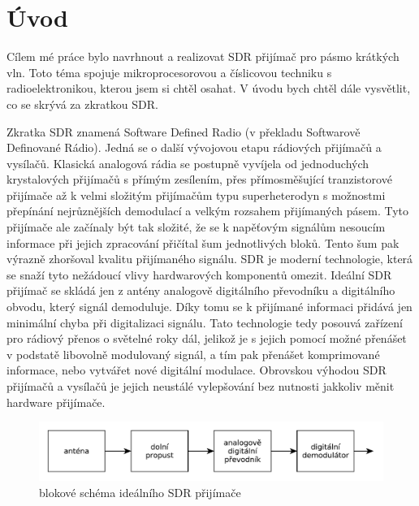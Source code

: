 \section*{Úvod}
\indent\indent Cílem mé práce bylo navrhnout a realizovat SDR přijímač pro pásmo krátkých vln. Toto téma spojuje mikroprocesorovou a číslicovou techniku s radioelektronikou, kterou jsem si chtěl osahat. V úvodu bych chtěl dále vysvětlit, co se skrývá za zkratkou SDR.

Zkratka SDR znamená Software Defined Radio (v překladu Softwarově Definované Rádio). Jedná se o další vývojovou etapu rádiových přijímačů a vysílačů. Klasická analogová rádia se postupně vyvíjela od jednoduchých krystalových přijímačů s přímým zesílením, přes přímosměšující tranzistorové přijímače až k velmi složitým přijímačům typu superheterodyn s možnostmi přepínání nejrůznějších demodulací a velkým rozsahem přijímaných pásem. Tyto přijímače ale začínaly být tak složité, že se k napěťovým signálům nesoucím informace při jejich zpracování přičítal šum jednotlivých bloků. Tento šum pak výrazně zhoršoval kvalitu přijímaného signálu. SDR je moderní technologie, která se snaží tyto nežádoucí vlivy hardwarových komponentů omezit. Ideální SDR přijímač se skládá jen z antény analogově digitálního převodníku a digitálního obvodu, který signál demoduluje. Díky tomu se k přijímané informaci přidává jen minimální chyba při digitalizaci signálu. Tato technologie tedy posouvá zařízení pro rádiový přenos o světelné roky dál, jelikož je s jejich pomocí možné přenášet v podstatě libovolně modulovaný signál, a tím pak přenášet komprimované informace, nebo vytvářet nové digitální modulace. Obrovskou výhodou SDR přijímačů a vysílačů je jejich neustálé vylepšování bez nutnosti jakkoliv měnit hardware přijímače.
\begin{figure}[H]
	\centering
	\includegraphics[width=170mm]{img/i_sdr.pdf}
	\caption{blokové schéma ideálního SDR přijímače}    		
\end{figure}

\clearpage
		
	
  		
  		
